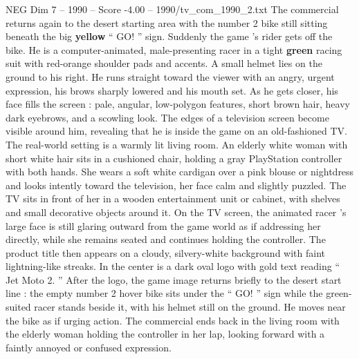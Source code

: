 \begin{textsample}{NEG Dim 7 – 1990 – Score -4.00 – 1990/tv\_com\_1990\_2.txt}
The commercial returns again to the desert starting area with the number 2 bike still sitting beneath the big \textbf{yellow} “ GO! ” sign.
Suddenly the game ’s rider gets off the bike.
He is a computer-animated, male-presenting racer in a tight \textbf{green} racing suit with red-orange shoulder pads and accents.
A small helmet lies on the ground to his right.
He runs straight toward the viewer with an angry, urgent expression, his brows sharply lowered and his mouth set.
As he gets closer, his face fills the screen : pale, angular, low-polygon features, short brown hair, heavy dark eyebrows, and a scowling look.
The edges of a television screen become visible around him, revealing that he is inside the game on an old-fashioned TV.
The real-world setting is a warmly lit living room.
An elderly white woman with short white hair sits in a cushioned chair, holding a gray PlayStation controller with both hands.
She wears a soft white cardigan over a pink blouse or nightdress and looks intently toward the television, her face calm and slightly puzzled.
The TV sits in front of her in a wooden entertainment unit or cabinet, with shelves and small decorative objects around it.
On the TV screen, the animated racer ’s large face is still glaring outward from the game world as if addressing her directly, while she remains seated and continues holding the controller.
The product title then appears on a cloudy, silvery-white background with faint lightning-like streaks.
In the center is a dark oval logo with gold text reading “ Jet Moto 2. ” After the logo, the game image returns briefly to the desert start line : the empty number 2 hover bike sits under the “ GO! ” sign while the green-suited racer stands beside it, with his helmet still on the ground.
He moves near the bike as if urging action.
The commercial ends back in the living room with the elderly woman holding the controller in her lap, looking forward with a faintly annoyed or confused expression.

\end{textsample}
